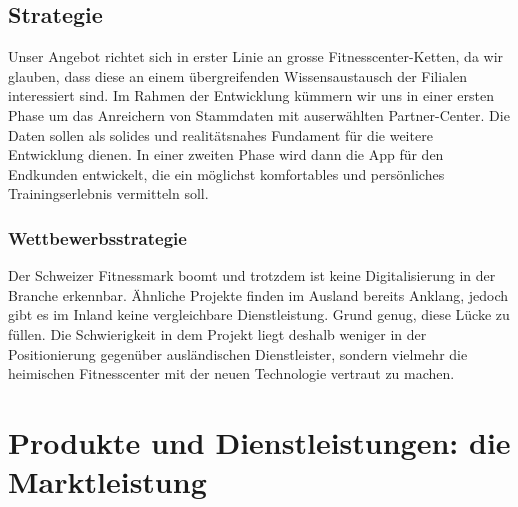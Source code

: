 \subsection{Strategie}
Unser Angebot richtet sich in erster Linie an grosse Fitnesscenter-Ketten, da wir glauben, dass diese an einem übergreifenden Wissensaustausch der Filialen interessiert sind. Im Rahmen der Entwicklung kümmern wir uns in einer ersten Phase um das Anreichern von Stammdaten mit auserwählten Partner-Center. Die Daten sollen als solides und realitätsnahes Fundament für die weitere Entwicklung dienen. In einer zweiten Phase wird dann die App für den Endkunden entwickelt, die ein möglichst komfortables und persönliches Trainingserlebnis vermitteln soll. 

\subsubsection{Wettbewerbsstrategie}
Der Schweizer Fitnessmark boomt und trotzdem ist keine Digitalisierung in der Branche erkennbar. Ähnliche Projekte finden im Ausland bereits Anklang, jedoch gibt es im Inland keine vergleichbare Dienstleistung. Grund genug, diese Lücke zu füllen. Die Schwierigkeit in dem Projekt liegt deshalb weniger in der Positionierung gegenüber ausländischen Dienstleister, sondern vielmehr die heimischen Fitnesscenter mit der neuen Technologie vertraut zu machen.


\section{Produkte und Dienstleistungen: die Marktleistung}

